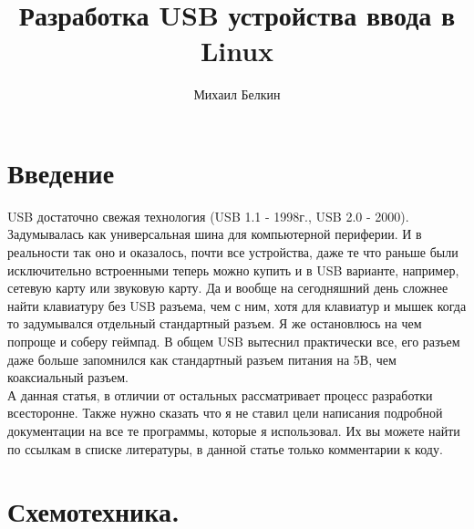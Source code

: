 \documentclass[12pt,a4paper]{article}
\begin{document}
\begin{titlepage}
\title{Разработка USB устройства ввода в Linux}
\author{Михаил Белкин}
\maketitle
\end{titlepage}

\tableofcontents
\newpage

\section{Введение}
    USB достаточно свежая технология (USB 1.1 - 1998г., USB 2.0 - 2000).
    Задумывалась как универсальная шина для компьютерной периферии.
    И в реальности так оно и оказалось, почти все устройства, даже те что
    раньше были исключительно встроенными теперь можно купить и в USB варианте,
    например, сетевую карту или звуковую карту. Да и вообще на сегодняшний
    день сложнее найти клавиатуру без USB разъема, чем с ним, хотя для
    клавиатур и мышек когда то задумывался отдельный стандартный разъем.
    Я же остановлюсь на чем попроще и соберу геймпад. В общем USB вытеснил
    практически все, его разъем даже больше запомнился как
    стандартный разъем питания на 5В, чем коаксиальный разъем.\\
    А данная статья, в отличии от остальных рассматривает процесс разработки
    всесторонне. Также нужно сказать что я не ставил цели написания
    подробной документации на все те программы, которые я использовал. Их вы
    можете найти по ссылкам в списке литературы, в данной статье только
    комментарии к коду.

\section{Схемотехника.}
\end{document}
